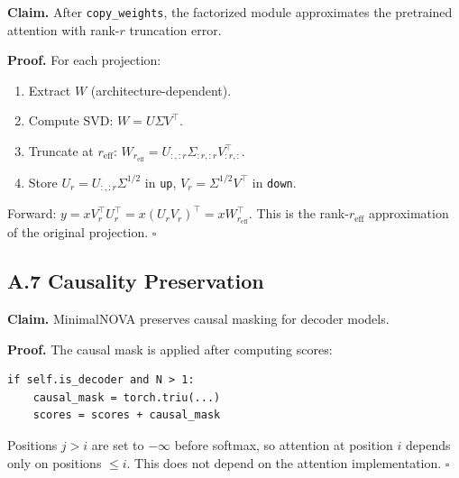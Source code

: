 \textbf{Claim.} After \texttt{copy\_weights}, the factorized module approximates the 
pretrained attention with rank-$r$ truncation error.

\textbf{Proof.} For each projection:
\begin{enumerate}
\item Extract $W$ (architecture-dependent).
\item Compute SVD: $W = U \Sigma V^\top$.
\item Truncate at $r_\text{eff}$: $W_{r_\text{eff}} = U_{:, :r} \Sigma_{:r, :r} V_{:r, :}^\top$.
\item Store $U_r = U_{:, :r} \Sigma^{1/2}$ in \texttt{up}, $V_r = \Sigma^{1/2} V^\top$ in \texttt{down}.

\end{enumerate}
Forward: $y = x V_r^\top U_r^\top = x (U_r V_r)^\top = x W_{r_\text{eff}}^\top$. 
This is the rank-$r_\text{eff}$ approximation of the original projection. $\square$

\subsection{A.7 Causality Preservation}

\textbf{Claim.} MinimalNOVA preserves causal masking for decoder models.

\textbf{Proof.} The causal mask is applied after computing scores:

\begin{lstlisting}
if self.is_decoder and N > 1:
    causal_mask = torch.triu(...)
    scores = scores + causal_mask
\end{lstlisting}

Positions $j > i$ are set to $-\infty$ before softmax, so attention at 
position $i$ depends only on positions $\leq i$. This does not depend on the 
attention implementation. $\square$

